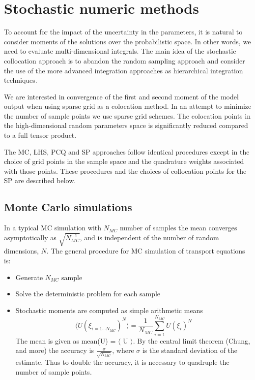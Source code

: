 \documentclass{article}
\begin{document}
\section{Stochastic numeric methods}
To account for the impact of the uncertainty in the parameters, it is natural to consider moments
of the solutions over the probabilistic space. In other words, we need to evaluate multi-dimensional
integrals. The main idea of the stochastic collocation approach is to abandon the 
random sampling approach and consider the use of the more advanced integration approaches as 
hierarchical integration techniques.

We are interested in convergence of the first and second moment of the model output when using sparse
grid as a colocation method. In an attempt to minimize the number of sample points we use sparse grid
schemes. The colocation points in the high-dimensional random parameters space is significantly reduced 
compared to a full tensor product. 

The MC, LHS, PCQ and SP approaches follow identical procedures except in the 
choice of grid points in the sample space and the quadrature weights associated with those 
points. These procedures and the choices of collocation points for the SP are described below.

\subsection{Monte Carlo simulations}
In a typical MC simulation with $N_{MC}$ number of samples the mean converges asymptotically as 
$\sqrt{N_{MC}^{-1}}$, and is independent of the number of random dimensions, $N$.
The general procedure for MC simulation of transport equations is:
\begin{itemize}
\item Generate $N_{MC}$ sample
\item Solve the deterministic problem for each sample
\item Stochastic moments are computed as simple arithmetic means
\begin{equation}
\langle U(\xi_{i=1\cdots N_{MC}})^N\rangle = \frac{1}{N_{MC}}\sum_{i=1}^{N_{MC}}U(\xi_i)^N
\end{equation}
The mean is given as mean(U) = $\langle$ U $\rangle$. By the central limit theorem (Chung, and more)
the accuracy is $\frac{\sigma}{\sqrt{N_{MC}}}$, where $\sigma$ is the standard deviation of the estimate. 
Thus to double the accuracy, it is necessary to quadruple the number of sample points. 
\end{itemize}
\end{document}

